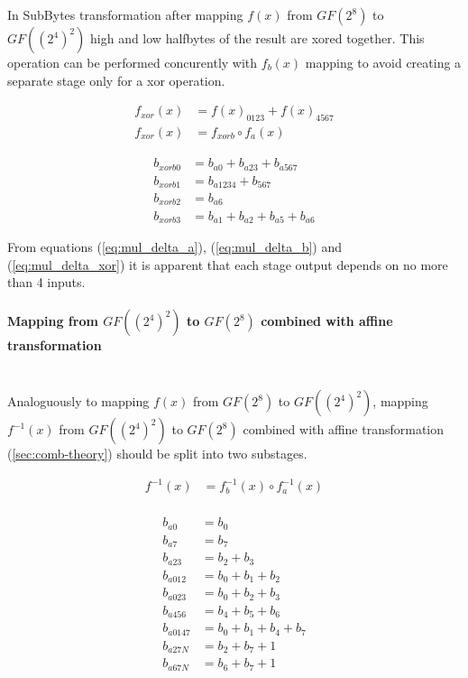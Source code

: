 In SubBytes transformation after mapping $f(x)$ from $GF(2^8)$ to $GF((2^4)^2)$ high and low halfbytes of the result are xored together. This operation can be performed concurently with $f_b(x)$ mapping to avoid creating a separate stage only for a xor operation.

\begin{equation}
\begin{aligned}
f_{xor}(x) &= f(x)_{0123} + f(x)_{4567} \\
f_{xor}(x) &= f_{xorb} \circ f_a(x)
\end{aligned}
\end{equation}

\begin{equation}
\label{eq:mul_delta_xor}
\begin{aligned}
b_{xorb0} &= b_{a0} + b_{a23} + b_{a567}       \\
b_{xorb1} &= b_{a1234} + b_{567}               \\
b_{xorb2} &= b_{a6}                            \\
b_{xorb3} &= b_{a1} + b_{a2} + b_{a5} + b_{a6}
\end{aligned}
\end{equation}

From equations (\ref{eq:mul_delta_a}), (\ref{eq:mul_delta_b}) and (\ref{eq:mul_delta_xor}) it is apparent that each stage output depends on no more than 4 inputs.


\paragraph{Mapping from $GF((2^4)^2)$ to $GF(2^8)$ combined with affine transformation}\mbox{}\\
Analoguously to mapping $f(x)$ from $GF(2^8)$ to $GF((2^4)^2)$, mapping $f^{-1}(x)$ from $GF((2^4)^2)$ to $GF(2^8)$ combined with affine transformation (\ref{sec:comb-theory}) should be split into two substages.

\begin{equation}
\begin{aligned}
f^{-1}(x) &= f_b^{-1}(x) \circ f_a^{-1}(x) \\
\end{aligned}
\end{equation}

\begin{equation}
\label{eq:mul_delta_inf_a}
\begin{aligned}
b_{a0}    &= b_0                    \\
b_{a7}    &= b_7                    \\
b_{a23}   &= b_2 + b_3              \\
b_{a012}  &= b_0 + b_1 + b_2        \\
b_{a023}  &= b_0 + b_2 + b_3        \\
b_{a456}  &= b_4 + b_5 + b_6        \\
b_{a0147} &= b_0 + b_1 + b_4 + b_7  \\
b_{a27N}  &= b_2 + b_7 + 1          \\
b_{a67N}  &= b_6 + b_7 + 1            
\end{aligned}
\end{equation}

